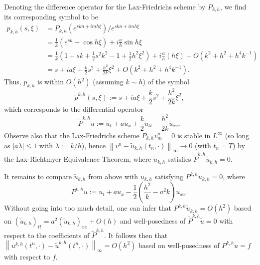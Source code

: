 \documentclass{article}
\providecommand{\abs}[1]{\left\lvert#1\right\rvert}
\providecommand{\norm}[1]{\left\lVert#1\right\rVert}
\begin{document}
\begin{itemize}
Denoting the difference operator for the Lax-Friedrichs scheme by $P_{k,h}$, we find its corresponding symbol to be
\begin{align*}
p_{k,h}(s,\xi) & = P_{k,h} \left( e^{skn + imh\xi} \right) / e^{skn + imh\xi} \\
               & = \frac{1}{k} \left( e^{sk} - \cos h \xi \right) + i \frac{a}{h} \sin h \xi \\
               & = \frac{1}{k} \left( 1 + sk + \frac{1}{2} s^2 k^2 - 1 + \frac{1}{2} h^2 \xi^2 \right) + i \frac{a}{h} \left( h \xi \right) + O \left( k^2 + h^2 + h^4 k^{-1} \right) \\
               & = s + i a \xi + \frac{k}{2} s^2 + \frac{h^2}{2k} \xi^2 + O \left( k^2 + h^2 + h^4 k^{-1} \right).
\end{align*}
Thus, $p_{k,h}$ is within $O \left( h^2 \right)$ (assuming $k \sim h$) of the symbol
\begin{equation*}
\tilde{p}^{k,h}(s,\xi) := s + i a \xi + \frac{k}{2} s^2 + \frac{h^2}{2k} \xi^2,
\end{equation*}
which corresponds to the differential operator
\begin{equation*}
\tilde{P}^{k,h} \tilde{u} := \tilde{u}_t + a \tilde{u}_x + \frac{k}{2} \tilde{u}_{tt} - \frac{h^2}{2k} \tilde{u}_{xx}.
\end{equation*}
Observe also that the Lax-Friedrichs scheme $P_{k,h} v^n_m = 0$ is stable in $L^{\infty}$ (so long as $\abs{a\lambda} \leq 1$ with $\lambda := k/h$), hence $\norm{v^n - \tilde{u}_{k,h} \left( t_n, \cdot \right)}_{\infty} \to 0$ (with $t_n = T$) by the Lax-Richtmyer Equivalence Theorem, where $\tilde{u}_{k,h}$ satisfies $\tilde{P}^{k,h} \tilde{u}_{k,h} = 0$.

It remains to compare $\tilde{u}_{k,h}$ from above with $u_{k,h}$ satisfying $P^{k,h} u_{k,h} = 0$, where
\begin{equation*}
P^{k,h} u := u_t + a u_x - \frac{1}{2} \left( \frac{h^2}{k} - a^2 k \right) u_{xx}.
\end{equation*}
Without going into too much detail, one can infer that $P^{k,h} \tilde{u}_{k,h} = O \left( h^2 \right)$ based on $\left( \tilde{u}_{k,h} \right)_{tt} = a^2 \left( \tilde{u}_{k,h} \right)_{xx} + O \left( h \right)$ and well-posedness of $\tilde{P}^{k,h} \tilde{u} = 0$ with respect to the coefficients of $\tilde{P}^{k,h}$. It follows then that $\norm{u^{k,h} \left( t^n, \cdot \right) - \tilde{u}^{k,h} \left( t^n, \cdot \right)}_{\infty} = O \left( h^2 \right)$ based on well-posedness of $P^{k,h} u = f$ with respect to $f$.


\end{itemize}
\end{document}
